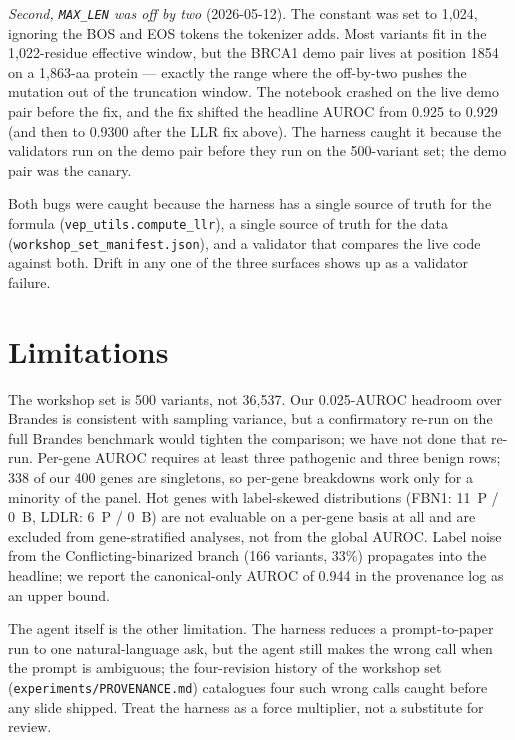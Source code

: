 \documentclass{article}
\begin{document}
\emph{Second, \texttt{MAX\_LEN} was off by two} (2026-05-12). The
constant was set to 1{,}024, ignoring the BOS and EOS tokens the
tokenizer adds. Most variants fit in the 1{,}022-residue effective
window, but the BRCA1 demo pair lives at position 1854 on a 1{,}863-aa
protein --- exactly the range where the off-by-two pushes the mutation
out of the truncation window. The notebook crashed on the live demo
pair before the fix, and the fix shifted the headline AUROC from 0.925
to 0.929 (and then to 0.9300 after the LLR fix above). The harness
caught it because the validators run on the demo pair before they run
on the 500-variant set; the demo pair was the canary.

Both bugs were caught because the harness has a single source of truth
for the formula (\texttt{vep\_utils.compute\_llr}), a single source of
truth for the data (\texttt{workshop\_set\_manifest.json}), and a
validator that compares the live code against both. Drift in any one of
the three surfaces shows up as a validator failure.

\section{Limitations}
\label{sec:limitations}

The workshop set is 500 variants, not 36{,}537. Our 0.025-AUROC headroom
over Brandes is consistent with sampling variance, but a confirmatory
re-run on the full Brandes benchmark would tighten the comparison; we
have not done that re-run. Per-gene AUROC requires at least three
pathogenic and three benign rows; 338 of our 400 genes are singletons,
so per-gene breakdowns work only for a minority of the panel. Hot genes
with label-skewed distributions (FBN1: 11~P / 0~B, LDLR: 6~P / 0~B) are
not evaluable on a per-gene basis at all and are excluded from
gene-stratified analyses, not from the global AUROC. Label noise from
the Conflicting-binarized branch (166 variants, 33\%) propagates into
the headline; we report the canonical-only AUROC of 0.944 in the
provenance log as an upper bound.

The agent itself is the other limitation. The harness reduces a
prompt-to-paper run to one natural-language ask, but the agent still
makes the wrong call when the prompt is ambiguous; the four-revision
history of the workshop set
(\texttt{experiments/PROVENANCE.md}) catalogues four such wrong calls
caught before any slide shipped. Treat the harness as a force
multiplier, not a substitute for review.
\end{document}

